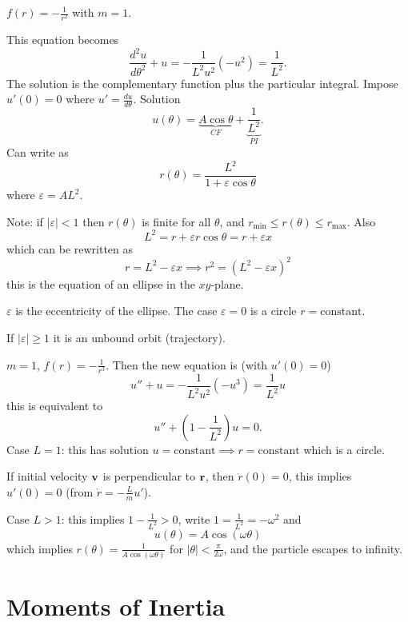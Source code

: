 \documentclass[10pt, a4paper]{article}
\begin{document}
\begin{example}
    $f(r) = -\frac{1}{r ^ 2}$ with $m = 1$.

    This equation becomes
    \[
    \frac{d ^ 2u}{d\theta ^ 2} + u = -\frac{1}{L ^ 2u ^ 2}(-u ^ 2) = \frac{1}{L ^ 2}.
    \]
    The solution is the complementary function plus the particular integral.
    Impose $u'(0) = 0$ where $u' = \frac{du}{d\theta}$.
    Solution
    \[
    u(\theta) = \underbrace{A\cos{\theta}}_{CF} + \underbrace{\frac{1}{L ^ 2}}_{PI}.
    \]
    Can write as
    \[
    r(\theta) = \frac{L ^ 2}{1 + \varepsilon\cos{\theta}}
    \]
    where $\varepsilon = AL ^ 2$.

    Note:
    if $|\varepsilon| < 1$ then $r(\theta)$ is finite for all $\theta$,
    and $r_{\text{min}} \leq r(\theta) \leq r_{\text{max}}$.
    Also
    \[
    L ^ 2 = r + \varepsilon r\cos{\theta} = r + \varepsilon x
    \]
    which can be rewritten as
    \[
    r = L ^ 2 - \varepsilon x \implies r ^ 2 = (L ^ 2 - \varepsilon x) ^ 2
    \]
    this is the equation of an ellipse in the $xy$-plane.

    $\varepsilon$ is the eccentricity of the ellipse.
    The case $\varepsilon = 0$ is a circle $r = \text{constant}$.

    If $|\varepsilon| \geq 1$ it is an unbound orbit
    (trajectory).
\end{example}

\begin{example}
    $m = 1$,
    $f(r) = -\frac{1}{r ^ 3}$.
    Then the new equation is
    (with $u'(0) = 0$)
    \[
    u'' + u = -\frac{1}{L ^ 2u ^ 2}(-u ^ 3) = \frac{1}{L ^ 2}u
    \]
    this is equivalent to
    \[
    u'' + \left(1 - \frac{1}{L ^ 2}\right)u = 0.
    \]
    Case $L = 1$:
    this has solution $u = \text{constant} \implies r = \text{constant}$ which is a circle.

    If initial velocity $\mathbf{v}$ is perpendicular to $\mathbf{r}$,
    then $\dot{r}(0) = 0$,
    this implies $u'(0) = 0$
    (from $\dot{r} = -\frac{L}{m}u'$).

    Case $L > 1$:
    this implies $1 - \frac{1}{L ^ 2} > 0$,
    write $1 = \frac{1}{L ^ 2} = -\omega ^ 2$ and
    \[
    u(\theta) = A\cos(\omega\theta)
    \]
    which implies $r(\theta) = \frac{1}{A\cos(\omega\theta)}$ for $|\theta| < \frac{\pi}{2\omega}$,
    and the particle escapes to infinity.
\end{example}

\newpage

\section{Moments of Inertia}
\end{document}
